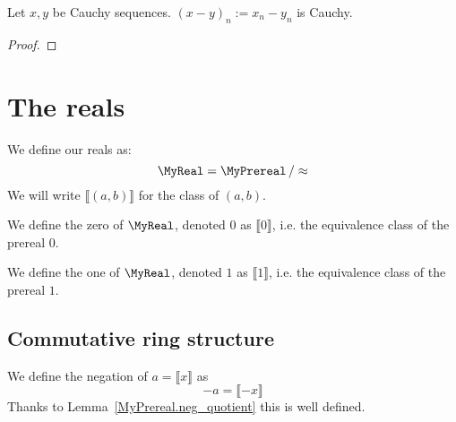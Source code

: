 \begin{lemma}
    \label{MyPrereal.IsCauchy.sub}
    \leanok
    Let $x,y$ be Cauchy sequences.
    $(x - y)_n := x_n - y_n$ is Cauchy.
\end{lemma}
\begin{proof}
    \leanok
\end{proof}



\section{The reals}

\begin{definition}
    \label{MyReal}
    \leanok
    We define our reals as:
    \[
    \MyReal = \MyPrereal \, / \approx
    \]
    We will write $⟦ (a, b) ⟧$ for the class of $(a,b)$.
\end{definition}


\begin{definition}
    \label{MyReal.zero}
    \leanok
    We define the zero of $\MyReal$, denoted $0$ as $⟦ 0 ⟧$, i.e. the equivalence class of the prereal $0$.
\end{definition}

\begin{definition}
    \label{MyReal.one}
    \leanok
    We define the one of $\MyReal$, denoted $1$ as $⟦ 1 ⟧$, i.e. the equivalence class of the prereal $1$.
\end{definition}

\subsection{Commutative ring structure}

\begin{definition}
    \label{MyReal.neg}
    \leanok
We define the negation of $a = ⟦ x ⟧$ as
\[
-a = ⟦ -x ⟧
\]
Thanks to Lemma~\ref{MyPrereal.neg_quotient} this is well defined.
\end{definition}

